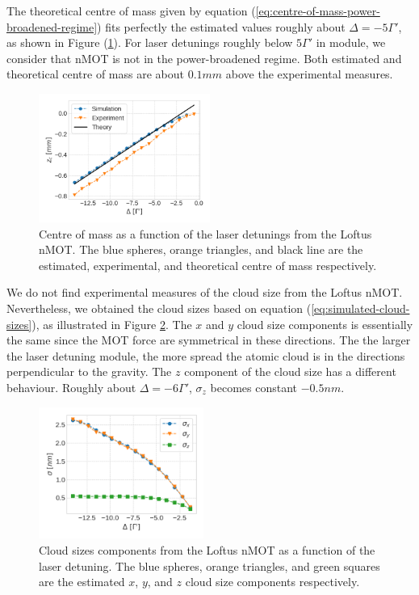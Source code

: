 The theoretical centre of mass given by equation (\ref{eq:centre-of-mass-power-broadened-regime}) fits perfectly the estimated values roughly about $ \Delta = -5\Gamma' $, as shown in Figure (\ref{fig:sr-centre-of-mass}). For laser detunings roughly below $ 5\Gamma' $ in module, we consider that nMOT is not in the power-broadened regime. Both estimated and theoretical centre of mass are about $ 0.1 mm $ above the experimental measures.

\begin{figure}[!ht]
    \centering
    \includegraphics[width=0.5\textwidth]{USPSC-img/sr_centre_of_mass.png}
    \vspace{5px}
    \caption{Centre of mass as a function of the laser detunings from the Loftus nMOT. The blue spheres, orange triangles, and black line are the estimated, experimental, and theoretical centre of mass respectively.}
    \label{fig:sr-centre-of-mass}
\end{figure}

We do not find experimental measures of the cloud size from the Loftus nMOT. Nevertheless, we obtained the cloud sizes based on equation (\ref{eq:simulated-cloud-sizes}), as illustrated in Figure \ref{fig:sr-loftus-cloud-size}. The $x$ and $y$ cloud size components is essentially the same since the MOT force are symmetrical in these directions. The the larger the laser detuning module, the more spread the atomic cloud is in the directions perpendicular to the gravity. The $z$ component of the cloud size has a different behaviour. Roughly about $ \Delta = -6\Gamma' $, $ \sigma_z $ becomes constant $ -0.5nm $.

\begin{figure}[!ht]
    \centering
    \includegraphics[width=0.48\textwidth]{USPSC-img/sr_loftus_cloud_size.png}
    \vspace{5px}
    \caption{Cloud sizes components from the Loftus nMOT as a function of the laser detuning. The blue spheres, orange triangles, and green squares are the estimated $ x $, $ y $, and $ z $ cloud size components respectively.}
    \label{fig:sr-loftus-cloud-size}
\end{figure}


